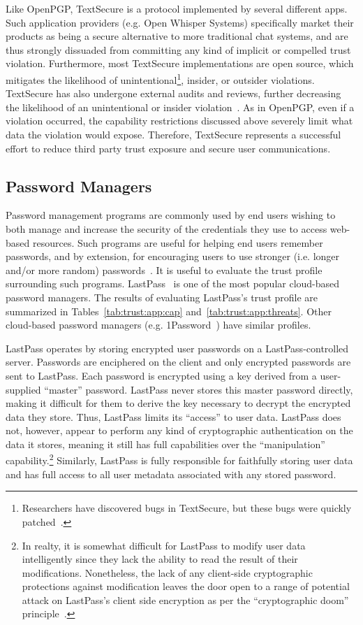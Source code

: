 Like OpenPGP, TextSecure is a protocol implemented by several
different apps. Such application providers (e.g. Open Whisper Systems)
specifically market their products as being a secure alternative to
more traditional chat systems, and are thus strongly dissuaded from
committing any kind of implicit or compelled trust
violation. Furthermore, most TextSecure implementations are open
source, which mitigates the likelihood of
unintentional\footnote{Researchers have discovered bugs in TextSecure,
  but these bugs were quickly patched~\cite{frosch2014}.}, insider, or
outsider violations. TextSecure has also undergone external audits and
reviews, further decreasing the likelihood of an unintentional or
insider violation~\cite{frosch2014}. As in OpenPGP, even if a
violation occurred, the capability restrictions discussed above
severely limit what data the violation would expose. Therefore,
TextSecure represents a successful effort to reduce third party trust
exposure and secure user communications.

\subsection{Password Managers}

Password management programs are commonly used by end users wishing to
both manage and increase the security of the credentials they use to
access web-based resources. Such programs are useful for helping end
users remember passwords, and by extension, for encouraging users to
use stronger (i.e. longer and/or more random)
passwords~\cite{brodkin-passman, krebs-passwords,
  schneier-passwords}. It is useful to evaluate the trust profile
surrounding such programs. LastPass~\cite{lastpass} is one of the most
popular cloud-based password managers. The results of evaluating
LastPass's trust profile are summarized in
Tables~\ref{tab:trust:app:cap} and~\ref{tab:trust:app:threats}. Other
cloud-based password managers (e.g. 1Password~\cite{onepassword}) have
similar profiles.

LastPass operates by storing encrypted user passwords on a
LastPass-controlled server. Passwords are enciphered on the client and
only encrypted passwords are sent to LastPass. Each password is
encrypted using a key derived from a user-supplied ``master''
password. LastPass never stores this master password directly, making
it difficult for them to derive the key necessary to decrypt the
encrypted data they store. Thus, LastPass limits its ``access'' to
user data. LastPass does not, however, appear to perform any kind of
cryptographic authentication on the data it stores, meaning it still
has full capabilities over the ``manipulation''
capability.\footnote{In realty, it is somewhat difficult for LastPass
  to modify user data intelligently since they lack the ability to
  read the result of their modifications. Nonetheless, the lack of any
  client-side cryptographic protections against modification leaves
  the door open to a range of potential attack on LastPass's client
  side encryption as per the ``cryptographic doom''
  principle~\cite{marlinspike-doom}.}  Similarly, LastPass is fully
responsible for faithfully storing user data and has full access to
all user metadata associated with any stored password.

